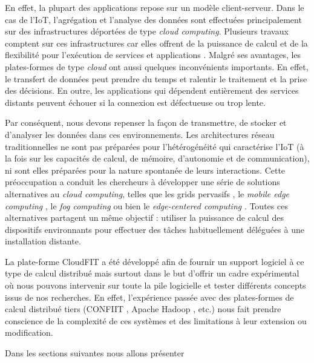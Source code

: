En effet, la plupart des applications repose sur un modèle client-serveur. Dans le cas de l'IoT, l'agrégation et l'analyse des données sont effectuées principalement sur des infrastructures déportées de type \textit{cloud computing}. Plusieurs travaux \cite{Miorandi2012, Gubbi2013, Fazio2015} comptent sur ces infrastructures car elles offrent de la puissance de calcul  et de la flexibilité pour l'exécution de services et applications \cite{Serrano2013}. Malgré ses avantages, les plates-formes de type \textit{cloud} ont aussi quelques inconvénients importants. En effet, le transfert de données peut prendre du temps et ralentir le traitement et la prise des décisions. En outre, les applications qui dépendent entièrement des services distants peuvent échouer si la connexion est défectueuse ou trop lente.

Par conséquent, nous devons repenser la façon de transmettre, de stocker et d'analyser les données dans ces environnements. Les architectures réseau traditionnelles ne sont pas préparées pour l'hétérogénéité qui caractérise l'IoT (à la fois sur les capacités de calcul, de mémoire, d'autonomie et de communication), ni sont elles préparées pour la nature spontanée de leurs interactions. Cette préoccupation a conduit les chercheurs à développer une série de solutions alternatives au \textit{cloud computing}, telles que les grids pervasifs \cite{Parashar2010}, le \textit{mobile edge computing} \cite {Dey2013,MEC,Satyanarayanan09}, le \textit{fog computing} \cite{Bonomi2012} ou bien le \textit{edge-centered computing} \cite{Lopez2015}. Toutes ces alternatives partagent un même objectif : utiliser la puissance de calcul des dispositifs environnants pour effectuer des tâches habituellement déléguées à une installation distante. 

La plate-forme CloudFIT a été développé afin de fournir un support logiciel à ce type de calcul distribué mais surtout dans le but d'offrir un cadre expérimental où nous pouvons intervenir sur toute la pile logicielle et tester différents concepts issus de nos recherches. En effet, l'expérience passée avec des plates-formes de calcul distribué tiers (CONFIIT \cite{Flauzac10}, Apache Hadoop \cite{Hadoop,Steffenel13b}, etc.) nous fait prendre conscience de la complexité de ces systèmes et des limitations à leur  extension ou modification. 
  
Dans les sections suivantes nous allons présenter %

